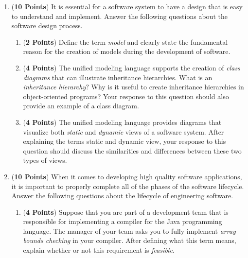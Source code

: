 \documentclass[12pt,epsf,psfig,graphicx]{article}
\begin{document}
\begin{enumerate}
\begin{enumerate}
\end{enumerate}

\newpage

\item ({\bf 10 Points}) It is essential for a software system to have
  a design that is easy to understand and implement.  Answer the
  following questions about the software design process.

\begin{enumerate}

\item ({\bf 2 Points}) Define the term {\em model} and clearly state
  the fundamental reason for the creation of models during the
  development of software.

\item ({\bf 4 Points}) The unified modeling language supports the
  creation of {\em class diagrams} that can illustrate inheritance
  hierarchies.  What is an {\em inheritance hierarchy}?  Why is it
  useful to create inheritance hierarchies in object-oriented
  programs?  Your response to this question should also provide an
  example of a class diagram.

\item ({\bf 4 Points}) The unified modeling language provides
  diagrams that visualize both {\em static} and {\em dynamic} views of
  a software system.  After explaining the terms static and dynamic
  view, your response to this question should discuss the similarities
  and differences between these two types of views.

\end{enumerate}

\newpage

\item ({\bf 10 Points}) When it comes to developing high quality
  software applications, it is important to properly complete all of
  the phases of the software lifecycle.  Answer the following
  questions about the lifecycle of engineering software.

\begin{enumerate}

\item ({\bf 4 Points}) Suppose that you are part of a development team
  that is responsible for implementing a compiler for the Java
  programming language.  The manager of your team asks you to fully
  implement {\em array-bounds checking} in your compiler.  After
  defining what this term means, explain whether or not this
  requirement is {\em feasible}.


\end{enumerate}
\end{enumerate}
\end{document}
